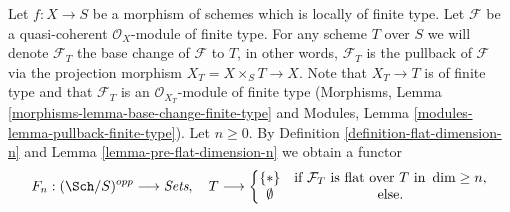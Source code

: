 \begin{situation}
\label{situation-flat-dimension-n}
Let $f : X \to S$ be a morphism of schemes which is locally of finite type.
Let $\mathcal{F}$ be a quasi-coherent $\mathcal{O}_X$-module of finite
type. For any scheme $T$ over $S$ we will denote $\mathcal{F}_T$ the
base change of $\mathcal{F}$ to $T$, in other words, $\mathcal{F}_T$
is the pullback of $\mathcal{F}$ via the projection morphism
$X_T = X \times_S T \to X$. Note that $X_T \to T$ is of finite type
and that $\mathcal{F}_T$ is an $\mathcal{O}_{X_T}$-module
of finite type (Morphisms, Lemma
\ref{morphisms-lemma-base-change-finite-type} and
Modules, Lemma \ref{modules-lemma-pullback-finite-type}).
Let $n \geq 0$. By Definition \ref{definition-flat-dimension-n} and
Lemma \ref{lemma-pre-flat-dimension-n} we obtain a functor
\begin{equation}
\label{equation-flat-dimension-n}
F_n : (\Sch/S)^{opp} \longrightarrow \textit{Sets}, \quad
T \longrightarrow \left\{
\begin{matrix}
\{*\} & \text{if }\mathcal{F}_T\text{ is flat over }T\text{ in }\dim \geq n, \\
\emptyset & \text{else.}
\end{matrix}
\right.
\end{equation}
\end{situation}